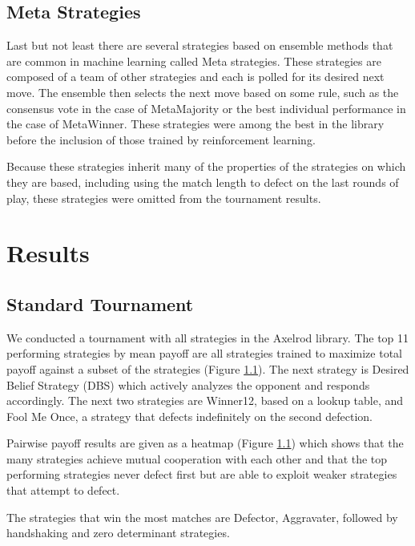 \documentclass{article}
\begin{document}
\subsection{Meta Strategies}

Last but not least there are several strategies based on ensemble methods that
are common in machine learning called Meta strategies. These strategies are
composed of a team of other strategies and each is polled for its desired next
move. The ensemble then selects the next move based on some rule, such as the
consensus vote in the case of MetaMajority or the best individual performance
in the case of MetaWinner. These strategies were among the best in the library
before the inclusion of those trained by reinforcement learning.

Because these strategies inherit many of the properties of the strategies
on which they are based, including using the match length to defect on the last
rounds of play, these strategies were omitted from the tournament results.

\section{Results}

\subsection{Standard Tournament}

We conducted a tournament with all strategies in the Axelrod library. The top
11 performing strategies by mean payoff are all strategies trained to maximize
total payoff against a subset of the strategies (Figure \ref{}). The next strategy is 
Desired Belief Strategy (DBS) which actively analyzes the opponent and responds
accordingly. The next two strategies are Winner12, based on a lookup table, and
Fool Me Once, a strategy that defects indefinitely on the second defection.

Pairwise payoff results are given as a heatmap (Figure \ref{}) which
shows that the many strategies achieve mutual cooperation with each other and
that the top performing strategies never defect first but are able to exploit
weaker strategies that attempt to defect.

The strategies that win the most matches are Defector, Aggravater, followed by
handshaking and zero determinant strategies.

\end{document}
